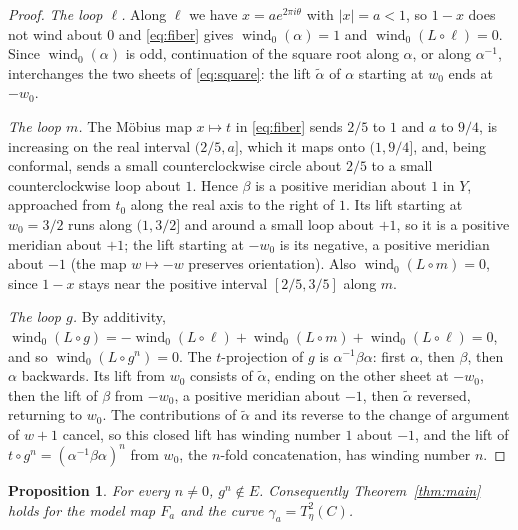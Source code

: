 \documentclass[12pt]{article}
\newcommand{\wind}{\operatorname{wind}}
\newtheorem{proposition}[theorem]{Proposition}
\theoremstyle{remark}
\numberwithin{equation}{section}
\begin{document}
\begin{proof}
\emph{The loop $\ell$.} Along $\ell$ we have $x=ae^{2\pi i\theta}$ with
$|x|=a<1$, so $1-x$ does not wind about $0$ and \eqref{eq:fiber} gives
$\wind_0(\alpha)=1$ and $\wind_0(L\circ\ell)=0$. Since $\wind_0(\alpha)$
is odd, continuation of the square root along
$\alpha$, or along $\alpha^{-1}$, interchanges the two sheets of
\eqref{eq:square}: the lift $\tilde\alpha$ of $\alpha$ starting at $w_0$
ends at $-w_0$.

\emph{The loop $m$.} The M\"obius map $x\mapsto t$ in \eqref{eq:fiber}
sends $2/5$ to $1$ and $a$ to $9/4$, is increasing on the real interval
$(2/5,a]$, which it maps onto $(1,9/4]$, and, being conformal, sends a
small counterclockwise circle about $2/5$ to a small counterclockwise loop
about $1$. Hence $\beta$ is a positive meridian about $1$ in $Y$,
approached from $t_0$ along the real axis to the right of $1$. Its lift
starting at $w_0=3/2$ runs along $(1,3/2]$ and around a small loop about
$+1$, so it is a positive meridian about $+1$; the lift starting at $-w_0$
is its negative, a positive meridian about $-1$ (the map $w\mapsto-w$
preserves orientation). Also $\wind_0(L\circ m)=0$, since $1-x$ stays near
the positive interval $[2/5,3/5]$ along $m$.

\emph{The loop $g$.} By additivity,
$\wind_0(L\circ g)=-\wind_0(L\circ\ell)+\wind_0(L\circ m)+\wind_0(L\circ\ell)=0$,
and so $\wind_0(L\circ g^n)=0$. The $t$-projection of $g$ is
$\alpha^{-1}\beta\alpha$: first $\alpha$, then $\beta$, then $\alpha$
backwards. Its lift from $w_0$ consists of $\tilde\alpha$, ending on the
other sheet at $-w_0$, then the lift of $\beta$ from $-w_0$, a positive
meridian about $-1$, then $\tilde\alpha$ reversed, returning to $w_0$. The
contributions of $\tilde\alpha$ and its reverse to the change of argument
of $w+1$ cancel, so this closed lift has winding number $1$ about $-1$,
and the lift of $t\circ g^n=(\alpha^{-1}\beta\alpha)^n$ from $w_0$, the
$n$-fold concatenation, has winding number $n$.
\end{proof}

\begin{proposition}\label{prop:notinE}
For every $n\ne0$, $g^n\notin E$. Consequently Theorem~\ref{thm:main}
holds for the model map $F_a$ and the curve $\gamma_a=T_\eta^2(C)$.
\end{proposition}
\end{document}
